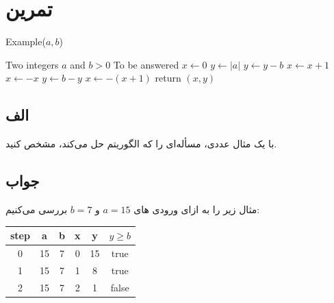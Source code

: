 \documentclass[]{article}
\begin{document}
    \section{تمرین}
    \begin{latin}
        \begin{algorithm}
        \caption{Example($a, b$)}
            \begin{algorithmic}
                \Require Two integers $a$ and $b > 0$
                \Ensure To be answered
                \State $x \gets 0$
                \State $y \gets |a|$    
                    \State $y \gets y - b$
                    \State $x \gets x + 1$
                \EndWhile
                    \State $x \gets -x$
                \EndIf
                    \State $y \gets b - y$
                    \State $x \gets - (x + 1)$
                \EndIf
                \State return $(x, y)$
            \end{algorithmic}
        \end{algorithm}
    \end{latin}
    
    \subsection{الف}
    با یک مثال عددی، مسأله‌ای را که الگوریتم حل می‌کند، مشخص کنید.
    \subsection*{جواب}

    مثال زیر را به ازای ورودی های
$a = 15$
و
$b = 7$
بررسی می‌کنیم:

\begin{latin}
    
\begin{table}[h]
    \centering
    \begin{tabular}{|c|c|c|c|c|c|}
        \hline
        step & a  & b & x & y  & $y \geq b$ \\ \hline
        0     & 15 & 7 & 0 & 15 & true                \\ \hline
        1     & 15 & 7 & 1 & 8  & true                \\ \hline
        2     & 15 & 7 & 2 & 1  & false               \\ \hline
    \end{tabular}
\end{table}
\end{latin}
\end{document}
